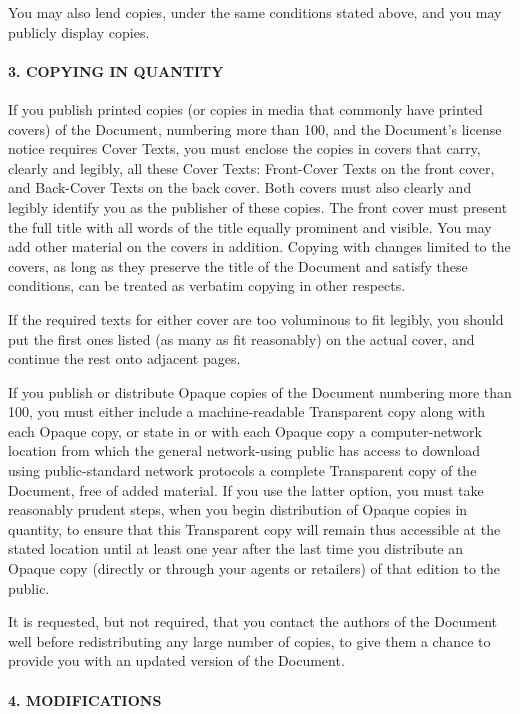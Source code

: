 You may also lend copies, under the same conditions stated above, and
you may publicly display copies.

\hypertarget{copying-in-quantity}{%
\paragraph{3. COPYING IN QUANTITY}\label{copying-in-quantity}}

If you publish printed copies (or copies in media that commonly have
printed covers) of the Document, numbering more than 100, and the
Document's license notice requires Cover Texts, you must enclose the
copies in covers that carry, clearly and legibly, all these Cover Texts:
Front-Cover Texts on the front cover, and Back-Cover Texts on the back
cover. Both covers must also clearly and legibly identify you as the
publisher of these copies. The front cover must present the full title
with all words of the title equally prominent and visible. You may add
other material on the covers in addition. Copying with changes limited
to the covers, as long as they preserve the title of the Document and
satisfy these conditions, can be treated as verbatim copying in other
respects.

If the required texts for either cover are too voluminous to fit
legibly, you should put the first ones listed (as many as fit
reasonably) on the actual cover, and continue the rest onto adjacent
pages.

If you publish or distribute Opaque copies of the Document numbering
more than 100, you must either include a machine-readable Transparent
copy along with each Opaque copy, or state in or with each Opaque copy a
computer-network location from which the general network-using public
has access to download using public-standard network protocols a
complete Transparent copy of the Document, free of added material. If
you use the latter option, you must take reasonably prudent steps, when
you begin distribution of Opaque copies in quantity, to ensure that this
Transparent copy will remain thus accessible at the stated location
until at least one year after the last time you distribute an Opaque
copy (directly or through your agents or retailers) of that edition to
the public.

It is requested, but not required, that you contact the authors of the
Document well before redistributing any large number of copies, to give
them a chance to provide you with an updated version of the Document.

\hypertarget{modifications}{%
\paragraph{4. MODIFICATIONS}\label{modifications}}

